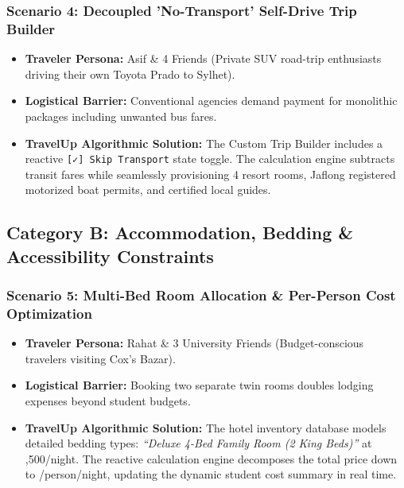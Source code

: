 \documentclass[11pt,a4paper]{article}
\begin{document}
\subsubsection{Scenario 4: Decoupled 'No-Transport' Self-Drive Trip Builder}
\begin{itemize}[leftmargin=*]
    \item \textbf{Traveler Persona:} Asif \& 4 Friends (Private SUV road-trip enthusiasts driving their own Toyota Prado to Sylhet).
    \item \textbf{Logistical Barrier:} Conventional agencies demand payment for monolithic packages including unwanted bus fares.
    \item \textbf{TravelUp Algorithmic Solution:} The Custom Trip Builder includes a reactive \texttt{[✓] Skip Transport} state toggle. The calculation engine subtracts transit fares while seamlessly provisioning 4 resort rooms, Jaflong registered motorized boat permits, and certified local guides.
\end{itemize}

\subsection{Category B: Accommodation, Bedding \& Accessibility Constraints}

\subsubsection{Scenario 5: Multi-Bed Room Allocation \& Per-Person Cost Optimization}
\begin{itemize}[leftmargin=*]
    \item \textbf{Traveler Persona:} Rahat \& 3 University Friends (Budget-conscious travelers visiting Cox's Bazar).
    \item \textbf{Logistical Barrier:} Booking two separate twin rooms doubles lodging expenses beyond student budgets.
    \item \textbf{TravelUp Algorithmic Solution:} The hotel inventory database models detailed bedding types: \textit{``Deluxe 4-Bed Family Room (2 King Beds)''} at ,500/night. The reactive calculation engine decomposes the total price down to /person/night, updating the dynamic student cost summary in real time.
\end{itemize}
\end{document}
